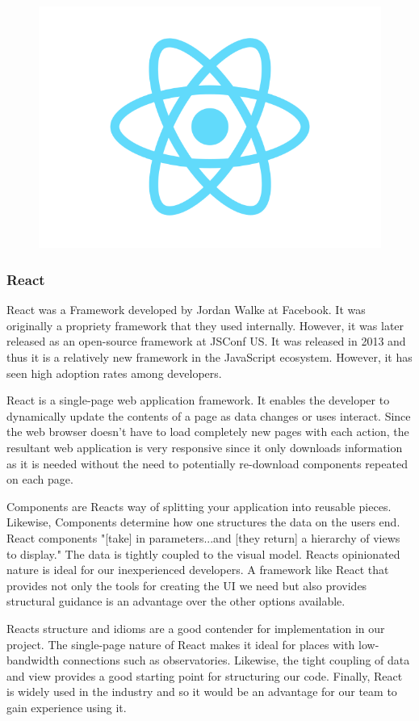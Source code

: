 \documentclass[12pt]{article}
\begin{document}
\begin{figure}[h]
	\centering
	\includegraphics[width=0.25\linewidth]{react}
\end{figure}

\subsubsection{React}

React was a Framework developed by Jordan Walke at Facebook. It was originally a propriety framework that they used internally. However, it was later released as an open-source framework at JSConf US.\cite{reactlaunch} It was released in 2013 and thus it is a relatively new framework in the JavaScript ecosystem.\cite{reactlaunch} However, it has seen high adoption rates among developers.

React is a single-page web application framework. It enables the developer to dynamically update the contents of a page as data changes or uses interact. Since the web browser doesn't have to load completely new pages with each action, the resultant web application is very responsive since it only downloads information as it is needed without the need to potentially re-download components repeated on each page.

Components are Reacts way of splitting your application into reusable pieces. Likewise, Components determine how one structures the data on the users end. React components "[take] in parameters...and [they return] a hierarchy of views to display."\cite{reacttutorial} The data is tightly coupled to the visual model. Reacts opinionated nature is ideal for our inexperienced developers. A framework like React that provides not only the tools for creating the UI we need but also provides structural guidance is an advantage over the other options available.

Reacts structure and idioms are a good contender for implementation in our project. The single-page nature of React makes it ideal for places with low-bandwidth connections such as observatories. Likewise, the tight coupling of data and view provides a good starting point for structuring our code. Finally, React is widely used in the industry and so it would be an advantage for our team to gain experience using it.
\end{document}
